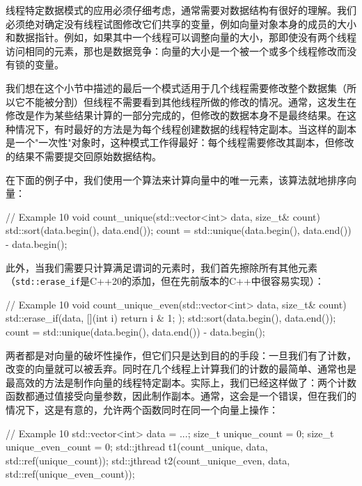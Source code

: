 线程特定数据模式的应用必须仔细考虑，通常需要对数据结构有很好的理解。我们必须绝对确定没有线程试图修改它们共享的变量，例如向量对象本身的成员的大小和数据指针。例如，如果其中一个线程可以调整向量的大小，那即使没有两个线程访问相同的元素，那也是数据竞争：向量的大小是一个被一个或多个线程修改而没有锁的变量。

我们想在这个小节中描述的最后一个模式适用于几个线程需要修改整个数据集（所以它不能被分割）但线程不需要看到其他线程所做的修改的情况。通常，这发生在修改是作为某些结果计算的一部分完成的，但修改的数据本身不是最终结果。在这种情况下，有时最好的方法是为每个线程创建数据的线程特定副本。当这样的副本是一个"一次性"对象时，这种模式工作得最好：每个线程需要修改其副本，但修改的结果不需要提交回原始数据结构。

在下面的例子中，我们使用一个算法来计算向量中的唯一元素，该算法就地排序向量：

\begin{code}
// Example 10
void count_unique(std::vector<int> data, size_t& count) {
  std::sort(data.begin(), data.end());
  count = std::unique(data.begin(),
                      data.end()) - data.begin();
}
\end{code}

此外，当我们需要只计算满足谓词的元素时，我们首先擦除所有其他元素（\texttt{std::erase\_if}是C++20的添加，但在先前版本的C++中很容易实现）：

\begin{code}
// Example 10
void count_unique_even(std::vector<int> data, size_t& count) {
  std::erase_if(data, [](int i) { return i & 1; });
  std::sort(data.begin(), data.end());
  count = std::unique(data.begin(),
                      data.end()) - data.begin();
}
\end{code}

两者都是对向量的破坏性操作，但它们只是达到目的的手段：一旦我们有了计数，改变的向量就可以被丢弃。同时在几个线程上计算我们的计数的最简单、通常也是最高效的方法是制作向量的线程特定副本。实际上，我们已经这样做了：两个计数函数都通过值接受向量参数，因此制作副本。通常，这会是一个错误，但在我们的情况下，这是有意的，允许两个函数同时在同一个向量上操作：

\begin{code}
// Example 10
std::vector<int> data = ...;
size_t unique_count = 0;
size_t unique_even_count = 0;
{
  std::jthread t1(count_unique, data,
                  std::ref(unique_count));
  std::jthread t2(count_unique_even, data,
                  std::ref(unique_even_count));
}
\end{code}

